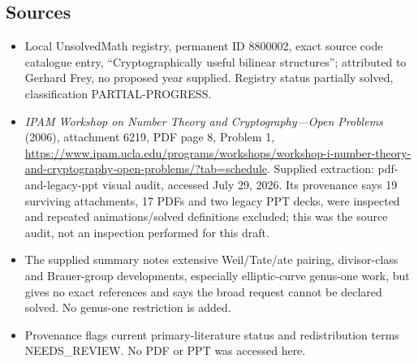 \documentclass[11pt]{article}
\begin{document}
\subsection{Sources}
\begin{itemize}
\item Local UnsolvedMath registry, permanent ID 8800002, exact source code catalogue entry, ``Cryptographically useful bilinear structures''; attributed to Gerhard Frey, no proposed year supplied. Registry status partially solved, classification PARTIAL-PROGRESS.
\item \emph{IPAM Workshop on Number Theory and Cryptography---Open Problems} (2006), attachment 6219, PDF page 8, Problem 1, \url{https://www.ipam.ucla.edu/programs/workshops/workshop-i-number-theory-and-cryptography-open-problems/?tab=schedule}. Supplied extraction: pdf-and-legacy-ppt visual audit, accessed July 29, 2026. Its provenance says 19 surviving attachments, 17 PDFs and two legacy PPT decks, were inspected and repeated animations/solved definitions excluded; this was the source audit, not an inspection performed for this draft.
\item The supplied summary notes extensive Weil/Tate/ate pairing, divisor-class and Brauer-group developments, especially elliptic-curve genus-one work, but gives no exact references and says the broad request cannot be declared solved. No genus-one restriction is added.
\item Provenance flags current primary-literature status and redistribution terms NEEDS\_REVIEW. No PDF or PPT was accessed here.
\end{itemize}
\end{document}
